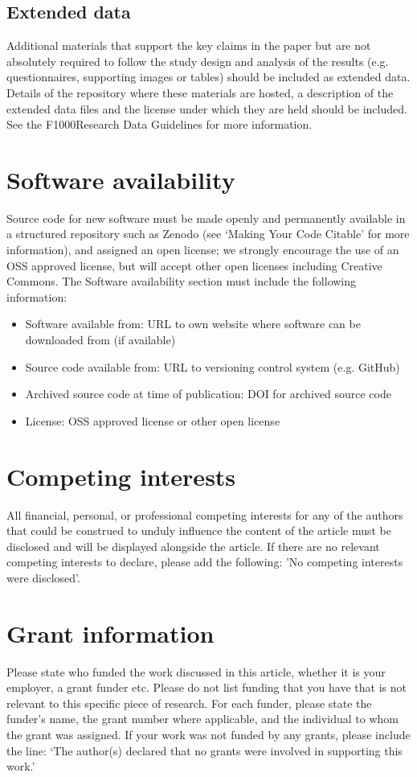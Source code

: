 \documentclass[10pt,a4paper]{article}
\begin{document}
\subsection*{Extended data}

Additional materials that support the key claims in the paper but are not absolutely required to follow the study design and analysis of the results (e.g. questionnaires, supporting images or tables) should be included as extended data. Details of the repository where these materials are hosted, a description of the extended data files and the license under which they are held should be included. See the F1000Research Data Guidelines for more information.

\section*{Software availability}
Source code for new software must be made openly and permanently available in a structured repository such as Zenodo (see ‘Making Your Code Citable’ for more information), and assigned an open license; we strongly encourage the use of an OSS approved license, but will accept other open licenses including Creative Commons. The Software availability section must include the following information:

\begin{itemize}
	\item Software available from: URL to own website where software can be downloaded from (if available)
	\item Source code available from: URL to versioning control system (e.g. GitHub)
	\item Archived source code at time of publication: DOI for archived source code
	\item License: OSS approved license or other open license  
\end{itemize}

\section*{Competing interests}
All financial, personal, or professional competing interests for any of the authors that could be construed to unduly influence the content of the article must be disclosed and will be displayed alongside the article. If there are no relevant competing interests to declare, please add the following: 'No competing interests were disclosed'.

\section*{Grant information}
Please state who funded the work discussed in this article, whether it is your employer, a grant funder etc. Please do not list funding that you have that is not relevant to this specific piece of research. For each funder, please state the funder’s name, the grant number where applicable, and the individual to whom the grant was assigned.
If your work was not funded by any grants, please include the line: ‘The author(s) declared that no grants were involved in supporting this work.’
\end{document}
